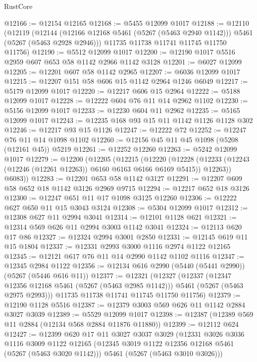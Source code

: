 \begin{lexlean}{RustCore}
\begin{coremodule}
@12166 := @12154 @12165
@12168 := @5455 @12099 @1017
@12188 := @12110
    (@12119
      (@12144 (@12166 @12168 @5461 (@5267 (@5463 @2940 @1142))) @5461 (@5267 (@5463 @2928 @2946)))
      @11735
      @11738
      @11741
      @11745
      @11750
      @11756)
@12190 := @5512 @12099 @1017
@12200 := @12190 @1017 @5516 @2959 @607 @653 @58 @1142 @2966 @1142 @3128
@12201 := @6027 @12099
@12205 := @12201 @607 @58 @1142 @2965
@12207 := @6036 @12099 @1017
@12215 := @12207 @151 @58 @606 @15 @1142 @2964 @1246 @6049
@12217 := @5179 @12099 @1017
@12220 := @12217 @606 @15 @2964
@12222 := @5188 @12099 @1017
@12228 := @12222 @604 @76 @11 @14 @2962 @1102
@12230 := @5156 @12099 @1017
@12233 := @12230 @604 @11 @2962
@12235 := @5165 @12099 @1017
@12243 := @12235 @168 @93 @15 @11 @1142 @1126 @1128 @302
@12246 := @12217 @93 @15 @1126
@12247 := @12222 @72
@12252 := @12247 @76 @11 @14 @1098 @1102
@12260 := @12156 @45 @11 @45 @1098 (@5208 (@12161 @45)) @5219
@12261 := @12252 @12260
@12263 := @5242 @12099 @1017
@12279 := @12200
    (@12205
      (@12215
        (@12220
          (@12228 (@12233 (@12243 (@12246 (@12261 @12263)) @6160 @6163 @6166 @6169 @5415)) @12263))
        @6083))
@12283 := @12201 @653 @58 @1142 @3127
@12291 := @12207 @609 @58 @652 @18 @1142 @3126 @2969 @9715
@12294 := @12217 @652 @18 @3126
@12300 := @12247 @651 @11 @17 @1098 @3125 @12260
@12306 := @12222 @627 @650 @11 @15 @3043 @3124
@12308 := @5304 @12099 @1017
@12312 := @12308 @627 @11 @2994 @3041
@12314 := @12101 @1128 @621
@12321 := @12314 @569 @626 @11 @2994 @3003 @1142 @3041
@12324 := @12113 @620 @17 @86
@12327 := @12324 @2994 @3001 @2850
@12331 := @12145 @619 @11 @15 @1804
@12337 := @12331 @2993 @3000 @1116 @2974 @1122 @12165
@12345 := @12121 @617 @76 @11 @14 @2990 @1142 @1102 @1116
@12347 := @12345 @2984 @1122
@12356 := @12134 @616 @2990 (@5440 (@5441 @2990)) (@5267 (@5446 @616 @11))
@12377 := @12321
    (@12327
      (@12337
        (@12347 @12356 @12168 @5461 (@5267 (@5463 @2985 @1142)))
        @5461
        (@5267 (@5463 @2975 @2993)))
      @11735
      @11738
      @11741
      @11745
      @11750
      @11756)
@12379 := @12190 @1128 @5516
@12387 := @12379 @3003 @569 @626 @11 @1142 @2884 @3027 @3039
@12389 := @5529 @12099 @1017
@12398 := @12387 (@12389 @569 @11 @2884 (@12134 @568 @2884 @11876 @11880))
@12399 := @12112 @624
@12427 := @12399
    @620
    @17
    @11
    @3027
    @3037
    @3029
    (@12331
      @3026
      @3036
      @1116
      @3009
      @1122
      @12165
      (@12345 @3019 @1122 @12356 @12168 @5461 (@5267 (@5463 @3020 @1142)))
      @5461
      (@5267 (@5463 @3010 @3026)))

\end{coremodule}
\end{lexlean}
